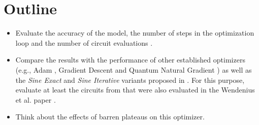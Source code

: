 \section{Outline}
\begin{itemize}
    \item
        Evaluate the accuracy of the model, the number of steps in the
        optimization loop and the number of circuit evaluations
        \cite{wendenius_gradient-free_2023,ostaszewski_structure_2021}.
    \item
        Compare the results with the performance of other established
        optimizers (e.g., Adam \cite{kingma_adam_2017}, Gradient Descent and
        Quantum Natural Gradient \cite{stokes_quantum_2020}) as well as the
        \emph{Sine Exact} and \emph{Sine Iterative} variants proposed in
        \cite{wendenius_gradient-free_2023}.
        For this purpose, evaluate at least the circuits from
        \cite{sim_expressibility_2019} that were also evaluated in the
        Wendenius et al. paper \cite{wendenius_gradient-free_2023}.
    \item
        Think about the effects of barren plateaus on this optimizer.
\end{itemize}
